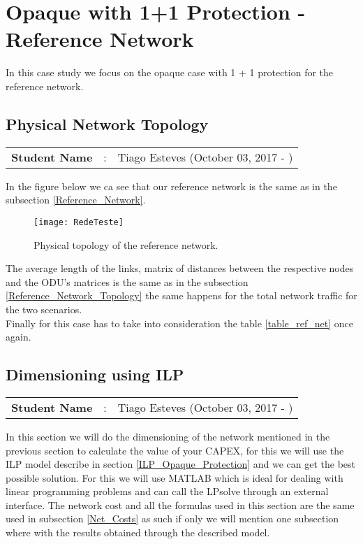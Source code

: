 \clearpage

\section{Opaque with 1+1 Protection - Reference Network}
In this case study we focus on the opaque case with 1 + 1 protection for the reference network.

\subsection{Physical Network Topology}
\begin{tcolorbox}	
\begin{tabular}{p{2.75cm} p{0.2cm} p{10.5cm}} 	
\textbf{Student Name}  &:& Tiago Esteves    (October 03, 2017 - )\\
\end{tabular}
\end{tcolorbox}

In the figure below we ca see that our reference network is the same as in the subsection \ref{Reference_Network}.

\begin{figure}[h!]
\centering
\texttt{[image: RedeTeste]}
\caption{Physical topology of the reference network.}
\end{figure}

The average length of the links, matrix of distances between the respective nodes and the ODU's matrices is the same as in the subsection \ref{Reference_Network_Topology} the same happens for the total network traffic for the two scenarios.\\

Finally for this case has to take into consideration the table \ref{table_ref_net} once again.


\subsection{Dimensioning using ILP}
\begin{tcolorbox}	
\begin{tabular}{p{2.75cm} p{0.2cm} p{10.5cm}} 	
\textbf{Student Name}  &:& Tiago Esteves    (October 03, 2017 - )\\
\end{tabular}
\end{tcolorbox}


In this section we will do the dimensioning of the network mentioned in the previous section to calculate the value of your CAPEX, for this we will use the ILP model describe in section \ref{ILP_Opaque_Protection} and we can get the best possible solution.
For this we will use MATLAB which is ideal for dealing with linear programming problems and can call the LPsolve through an external interface.
The network cost and all the formulas used in this section are the same used in subsection \ref{Net_Costs} as such if only we will mention one subsection where with the results obtained through the described model.\\


